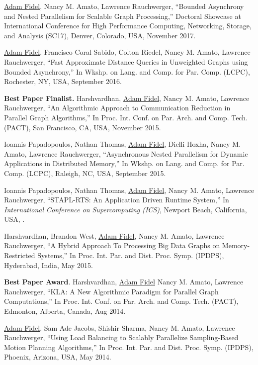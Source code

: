 \documentclass[a4paper,10pt,oneside]{article}
\begin{document}
\begin{body}
{\underline{Adam Fidel}, Nancy M. Amato, Lawrence Rauchwerger, ``Bounded Asynchrony and Nested Parallelism for Scalable Graph Processing,''
Doctoral Showcase at International Conference for High Performance Computing, Networking, Storage, and Analysis (SC17), Denver, Colorado, USA, November 2017.}

\EntryGap


{\underline{Adam Fidel}, Francisco Coral Sabido, Colton Riedel, Nancy M. Amato, Lawrence Rauchwerger, ``Fast Approximate Distance Queries in Unweighted Graphs using Bounded Asynchrony,'' In Wkshp. on Lang. and Comp. for Par. Comp. (LCPC), Rochester, NY, USA, September 2016.}

\EntryGap
{{\bf Best Paper Finalist.} Harshvardhan, \underline{Adam Fidel}, Nancy M. Amato, Lawrence Rauchwerger, ``An Algorithmic Approach to Communication Reduction in Parallel Graph Algorithms,'' In Proc. Int. Conf. on Par. Arch. and Comp. Tech. (PACT), San Francisco, CA, USA, November 2015.}

\EntryGap

{Ioannis Papadopoulos, Nathan Thomas, \underline{Adam Fidel}, Dielli Hoxha, Nancy M. Amato, Lawrence Rauchwerger, ``Asynchronous Nested Parallelism for Dynamic Applications in Distributed Memory,'' In Wkshp. on Lang. and Comp. for Par. Comp. (LCPC), Raleigh, NC, USA, September 2015.}

\EntryGap

{Ioannis Papadopoulos, Nathan Thomas, \underline{Adam Fidel}, Nancy M. Amato, Lawrence Rauchwerger, ``STAPL-RTS: An Application Driven Runtime System,'' In \textit{International Conference on Supercomputing (ICS)}, Newport Beach, California, USA, .}

\EntryGap

{Harshvardhan, Brandon West, \underline{Adam Fidel}, Nancy M. Amato, Lawrence Rauchwerger, ``A Hybrid Approach To Processing Big Data Graphs on Memory-Restricted Systems,'' In Proc. Int. Par. and Dist. Proc. Symp. (IPDPS), Hyderabad, India, May 2015.}

\EntryGap

{{\bf Best Paper Award}. Harshvardhan, \underline{Adam Fidel} Nancy M. Amato, Lawrence Rauchwerger, ``KLA: A New Algorithmic Paradigm for Parallel Graph Computations,'' In Proc. Int. Conf. on Par. Arch. and Comp. Tech. (PACT), Edmonton, Alberta, Canada, Aug 2014.}

\EntryGap

{\underline{Adam Fidel}, Sam Ade Jacobs, Shishir Sharma, Nancy M. Amato, Lawrence Rauchwerger, ``Using Load Balancing to Scalably Parallelize Sampling-Based Motion Planning Algorithms,'' In Proc. Int. Par. and Dist. Proc. Symp. (IPDPS), Phoenix, Arizona, USA, May 2014.}


\end{body}
\end{document}
